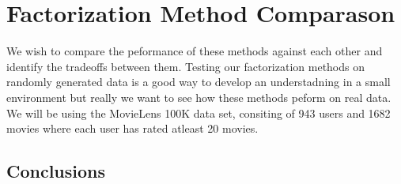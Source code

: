 \documentclass{article}
\begin{document}
\section{Factorization Method Comparason}
We wish to compare the peformance of these methods against each other and identify the tradeoffs between them. Testing our factorization methods on randomly generated data is a good way to develop an understadning in a small environment but really we want to see how these methods peform on real data. We will be using the MovieLens 100K data set, consiting of 943 users and 1682 movies where each user has rated atleast 20 movies.


\subsection{Conclusions}
\end{document}
